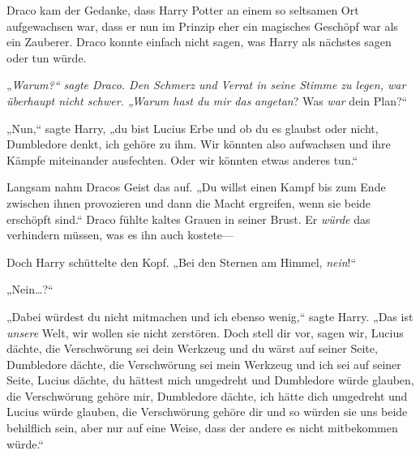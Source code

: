 Draco kam der Gedanke, dass Harry Potter an einem so seltsamen Ort aufgewachsen war, dass er nun im Prinzip eher ein magisches Geschöpf war als ein Zauberer. Draco konnte einfach nicht sagen, was Harry als nächstes sagen oder tun würde.

„\emph{Warum?“ sagte Draco. Den Schmerz und Verrat in seine Stimme zu legen, war überhaupt nicht schwer. „Warum hast du mir das} \emph{angetan}? Was \emph{war} dein Plan?“

„Nun,“ sagte Harry, „du bist Lucius Erbe und ob du es glaubst oder nicht, Dumbledore denkt, ich gehöre zu ihm. Wir könnten also aufwachsen und ihre Kämpfe miteinander ausfechten. Oder wir könnten etwas anderes tun.“

Langsam nahm Dracos Geist das auf. „Du willst einen Kampf bis zum Ende zwischen ihnen provozieren und dann die Macht ergreifen, wenn sie beide erschöpft sind.“ Draco fühlte kaltes Grauen in seiner Brust. Er \emph{würde} das verhindern müssen, was es ihn auch kostete—

Doch Harry schüttelte den Kopf. „Bei den Sternen am Himmel, \emph{nein}!“

„Nein…?“

„Dabei würdest du nicht mitmachen und ich ebenso wenig,“ sagte Harry. „Das ist \emph{unsere} Welt, wir wollen sie nicht zerstören. Doch stell dir vor, sagen wir, Lucius dächte, die Verschwörung sei dein Werkzeug und du wärst auf seiner Seite, Dumbledore dächte, die Verschwörung sei mein Werkzeug und ich sei auf seiner Seite, Lucius dächte, du hättest mich umgedreht und Dumbledore würde glauben, die Verschwörung gehöre mir, Dumbledore dächte, ich hätte dich umgedreht und Lucius würde glauben, die Verschwörung gehöre dir und so würden sie uns beide behilflich sein, aber nur auf eine Weise, dass der andere es nicht mitbekommen würde.“

